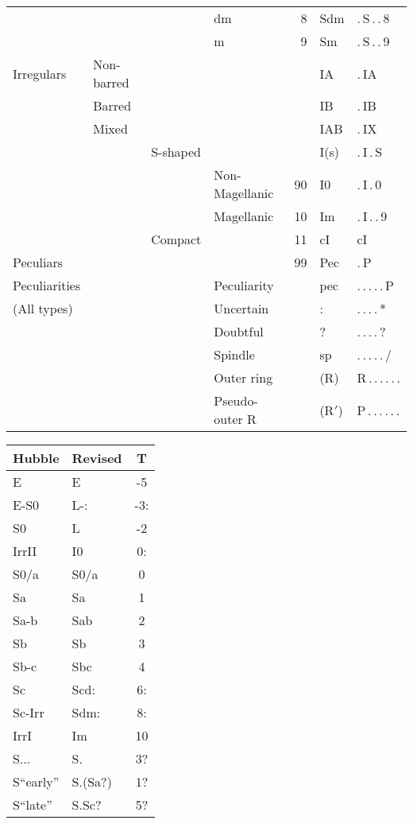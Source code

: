 \begin{center}
\begin{tabular}{l|l|l|l|r|l|l}
 & & & dm & 8 & Sdm & .\,S\,.\,.\,8 \\
 & & & m & 9 & Sm & .\,S\,.\,.\,9 \\ \hline
Irregulars & Non-barred & & & & IA & .\,IA \\
 & Barred & & & & IB & .\,IB \\
 & Mixed & & & & IAB & .\,IX \\
 & & S-shaped & & & I(s) & .\,I\,.\,S \\
 & & & Non-Magellanic & 90 & I0 & .\,I\,.\,0 \\
 & & & Magellanic & 10 & Im & .\,I\,.\,.\,9 \\
 & & Compact & & 11 & cI & cI\, \\ \hline
Peculiars & & & & 99 & Pec & .\,P \\
Peculiarities & & & Peculiarity & & pec & .\,.\,.\,.\,.\,P \\ \hline
(All types) & & & Uncertain & & : & .\,.\,.\,.\,* \\
 & & & Doubtful & & ? & .\,.\,.\,.\,? \\
 & & & Spindle & & sp & .\,.\,.\,.\,.\,/ \\
 & & & Outer ring & & (R) & R\,.\,.\,.\,.\,.\,. \\
 & & & Pseudo-outer R & & (R$'$) & P\,.\,.\,.\,.\,.\,. \smallskip \\ \hline
\end{tabular}
\label{t:morph}
\end{center}
\normalsize

\begin{center}
\begin{tabular}{l|l|c}
\hline
\multicolumn{1}{c|}{Hubble} & \multicolumn{1}{c|}{Revised} & T \\
\hline
 E      & E    & -5  \\
 E-S0   & L-:  & -3: \\
 S0     & L    & -2  \\
 IrrII  & I0   &  0: \\
 S0/a   & S0/a &  0  \\
 Sa     & Sa   &  1  \\
 Sa-b   & Sab  &  2  \\
 Sb     & Sb   &  3  \\
 Sb-c   & Sbc  &  4  \\
 Sc     & Scd: &  6: \\
 Sc-Irr & Sdm: &  8: \\
 IrrI   & Im   & 10  \\
\hline
 S...       & S.      & 3? \\
 S``early'' & S.(Sa?) & 1? \\
 S``late''  & S.Sc?   & 5? \\
\hline
\end{tabular}
\label{t:hubrev}
\end{center}

